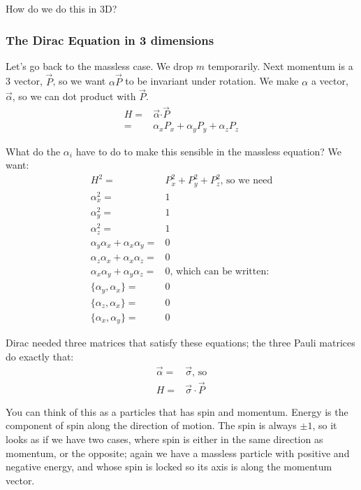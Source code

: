 \documentclass[]{article}
\begin{document}
 How do we do this in 3D?
 
\subsubsection{The Dirac Equation in 3 dimensions}

 Let's  go back to the massless case. We drop $m$ temporarily. Next momentum is a 3 vector, $\vec{P}$, so we want $\alpha \vec{P}$ to be invariant under rotation. We make $\alpha$ a vector, $\vec{\alpha}$, so we can dot product with $\vec{P}$.
\begin{align*}
	H =& \vec{\alpha} \boldsymbol{\cdot} \vec{P} \\
	=& \alpha_x P_x + \alpha_y P_y + \alpha_z P_z 
\end{align*}

What do the $\alpha_i$ have to do to make this sensible in the massless equation? We want:
\begin{align*}
	H^2 =& P_x^2 + P_y^2 + P_z^2 \text{, so we need}\\
	\alpha_x^2 =&1\\
	\alpha_y^2 =&1\\
	\alpha_z^2 =&1\\
	\alpha_y\alpha_x + \alpha_x\alpha_y=&0\\
	\alpha_z\alpha_x + \alpha_x\alpha_z=&0\\
	\alpha_x\alpha_y + \alpha_y\alpha_z=&0 \text{, which can be written:}\\
	\{\alpha_y,\alpha_x\} =&0\\
	\{\alpha_z,\alpha_x\} =&0\\
	\{\alpha_x,\alpha_y\} =&0
\end{align*}

Dirac needed three matrices that satisfy these equations; the three Pauli matrices do exactly that:
\begin{align*}
	\vec{\alpha}=&\vec{\sigma} \text{, so}\\
	H =& \vec{\sigma} \cdot \vec{P}
\end{align*}

You can think of this as a particles that has spin and momentum. Energy is the component of spin along the direction of motion. The spin is always $\pm 1$, so it looks as if we have two cases, where spin is either in the same direction as momentum, or the opposite; again we have a massless particle with positive and negative energy, and whose spin is locked so its axis is along the momentum vector.
\end{document}
